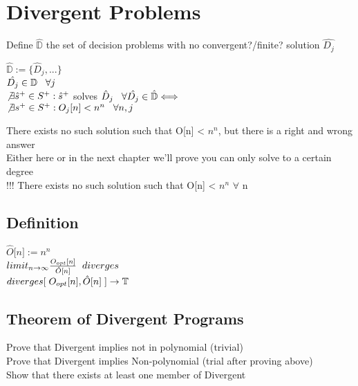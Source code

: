 \documentclass[11pt]{article}
\begin{document}
\newpage
\section{Divergent Problems}
Define $\hat{\mathbb{D}}$ the set of decision problems with no convergent?/finite? solution $\hat{D_j}$\\
\begin{center}
$
\hat{\mathbb{D}} := \{\hat{D}_j,...\}
$
\\ \vspace{2mm}
$
\hat{D_j} \in \mathbb{D} \hspace{3mm} \forall j
$
\\ \vspace{2mm}
$
\not \exists \hat{s}^{+} \in S^{+} : \hat{s}^{+}$ solves $\hat{D}_j \hspace{3mm} \forall \hat{D_j} \in \hat{\mathbb{D}} \Longleftrightarrow 
$
\\
$
\not \exists s^{+} \in S^{+} : O_j \lbrack n \rbrack < n^n  \hspace{3mm} \forall n,j
$
\end{center}
There exists no such solution such that O[n] < $n^n$, but there is a right and wrong answer\\
Either here or in the next chapter we'll prove you can only solve to a certain degree\\
 !!! There exists no such solution such that O[n] < $n^n$ \hspace{3mm} $\forall$ n
 
 \subsection{Definition}
 \begin{center}
$
\hat{O} \lbrack n \rbrack := n^n
$
\\ \vspace{2mm}
$
limit_{n \rightarrow \infty}\frac {O_{opt} \lbrack n \rbrack}{\hat{O}\lbrack n \rbrack} \hspace{2mm} diverges
$
\\ \vspace{2mm}
$
diverges \lbrack \hspace{1mm} O_{opt} \lbrack n \rbrack, \hat{O}\lbrack n \rbrack \hspace{1mm} \rbrack \rightarrow \mathbb{T}
$
\end{center}

\subsection{Theorem of Divergent Programs}
Prove that Divergent implies not in polynomial (trivial)\\
Prove that Divergent implies Non-polynomial (trial after proving above)\\
Show that there exists at least one member of Divergent\\
\end{document}
